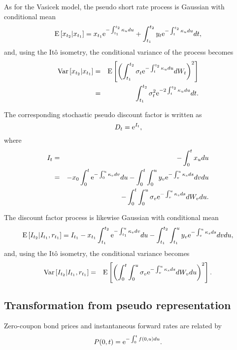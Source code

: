 As for the Vasicek model, the pseudo short rate process is Gaussian with conditional mean
\begin{equation}
\mathrm{E} \left[ x_{t_2} | x_{t_1} \right] = x_{t_1} \text{e}^{-\int_{t_1}^{t_2} \kappa_u du}  + \int_{t_1}^{t_2} y_t \text{e}^{-\int_t^{t_2} \kappa_u du} dt,
\end{equation}
and, using the It\^{o} isometry, the conditional variance of the process becomes
\begin{eqnarray}
\mathrm{Var} \left[ x_{t_2} | x_{t_1} \right] &=& \mathrm{E} \left[ \left( \int_{t_1}^{t_2} \sigma_t \text{e}^{-\int_t^{t_2} \kappa_u du} dW_t \right)^2 \right] \\
&=& \int_{t_1}^{t_2} \sigma_t^2 \text{e}^{-2\int_t^{t_2} \kappa_u du} dt.
\end{eqnarray}

The corresponding stochastic pseudo discount factor is written as
\begin{equation}
D_{t} = \text{e}^{I_t},
\end{equation}
where
\begin{eqnarray}
I_t &=& -\int_0^t x_u du \\
&=& - x_{0} \int_0^t \text{e}^{-\int_{0}^{u} \kappa_v dv} du - \int_0^t\int_{0}^{u} y_v \text{e}^{-\int_v^{u} \kappa_s ds} dv du \\
&& - \int_0^t \int_{0}^{u} \sigma_v \text{e}^{-\int_v^{u} \kappa_s ds} dW_v du.
\end{eqnarray}

The discount factor process is likewise Gaussian with conditional mean
\begin{equation}
\mathrm{E} \left[ I_{t_{2}} | I_{t_1}, r_{t_1} \right] = I_{t_1} - x_{t_1} \int_{t_1}^{t_2} \text{e}^{-\int_{t_1}^{u} \kappa_v dv} du - \int_{t_1}^{t_2} \int_{t_1}^{u} y_v \text{e}^{-\int_v^{u} \kappa_s ds} dv du,
\end{equation}
and, using the It\^{o} isometry, the conditional variance becomes
\begin{eqnarray}
\mathrm{Var} \left[ I_{t_{2}} | I_{t_1}, r_{t_1} \right] &=& \mathrm{E} \left[ \left( \int_0^t \int_{0}^{u} \sigma_v \text{e}^{-\int_v^{u} \kappa_s ds} dW_v du \right)^2 \right].
\end{eqnarray}

\subsection{Transformation from pseudo representation}

Zero-coupon bond prices and instantaneous forward rates are related by
\begin{equation}
P(0,t) = \text{e}^{- \int_0^t f(0,u) du}.
\end{equation}

